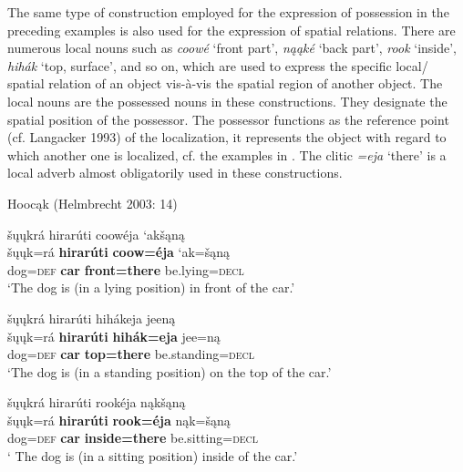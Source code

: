 \documentclass[output=paper]{LSP/langsci}
\begin{document}
The same type of construction employed for the expression of possession in the preceding examples is also used for the expression of spatial relations. There are numerous local nouns such as \textit{coow\'e}  `front part', \textit{n\k{a}\k{a}k\'e} `back part', \textit{rook} `inside', \textit{hihák} `top, surface', and so on, which are used to express the specific local/ spatial relation of an object vis-à-vis the spatial region of another object. The local nouns are the possessed nouns in these constructions. They designate the spatial position of the possessor. The possessor functions as the reference point (cf. Langacker 1993) of the localization, it represents the object with regard to which another one is localized, cf. the examples in . The clitic \textit{=eja} `there' is a local adverb almost obligatorily used in these constructions. 
 
\ea Hooc\k{a}k (Helmbrecht 2003: 14) \label{dogposition}

\ea 
\glll \v{s}\k{u}\k{u}kr\'a hirar\'uti  coow\'eja `ak\v{s}\k{a}n\k{a}  \\
\v{s}\k{u}\k{u}k=r\'a \textbf{hirar\'uti}  \textbf{coow=\'eja} `ak=\v{s}\k{a}n\k{a} \\ 
dog=\textsc{def} \textbf{car} \textbf{front=there} be.lying=\textsc{decl} \\
\glt `The dog is (in a lying position) in front of the car.'

\ex 
\glll šųųkrá hirarúti hihákeja jeen\k{a}\\
\v{s}\k{u}\k{u}k=r\'a \textbf{hirar\'uti} \textbf{hih\'ak=eja} jee=n\k{a} \\
dog=\textsc{def}  \textbf{car} \textbf{top=there} be.standing=\textsc{decl} \\
\glt `The dog is (in a standing position) on the top of the car.'

\ex 
\glll šųųkrá hirarúti rookéja n\k{a}k\v{s}\k{a}n\k{a}\\
\v{s}\k{u}\k{u}k=r\'a   \textbf{hirar\'uti} \textbf{rook=\'eja} n\k{a}k=\v{s}\k{a}n\k{a} \\
dog=\textsc{def} \textbf{car} \textbf{inside=there} be.sitting=\textsc{decl} \\
\glt` The dog is (in a sitting position) inside of the car.'
\z
\z
\end{document}
